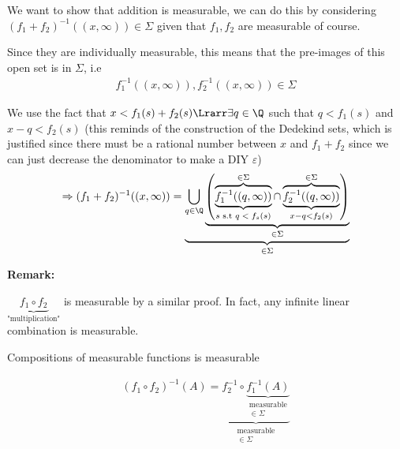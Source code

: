 \par\bigskip
\begin{prf}[]{}
  We want to show that addition is measurable, we can do this by considering $(f_1+f_2)^{-1}((x,\infty))\in\Sigma$ given that $f_1,f_2$ are measurable of course.
  \par\bigskip
  \noindent Since they are individually measurable, this means that the pre-images of this open set is in $\Sigma$, i.e
  \begin{equation*}
    \begin{gathered}
      f_1^{-1}((x,\infty)),f_2^{-1}((x,\infty))\in\Sigma
    \end{gathered}
  \end{equation*}\par
\noindent We use the fact that $x<f_1(s)+f_2(s)\Lrarr \exists q\in\Q$ such that $q<f_1(s)$ and $x-q<f_2(s)$ (this reminds of the construction of the Dedekind sets, which is justified since there must be a rational number between $x$ and $f_1+f_2$ since we can just decrease the denominator to make a DIY $\varepsilon$)
\begin{equation*}
  \begin{gathered}
    \Rightarrow (f_1+f_2)^{-1}((x,\infty)) = \underbrace{\bigcup_{q\in\Q}\underbrace{\left(\overbrace{\underbrace{f_1^{-1}((q,\infty))}_{\text{$s$ s.t $q<f_s(s)$}}}^{\in\Sigma}\cap \overbrace{\underbrace{f_2^{-1}((q,\infty))}_{x-q<f_2(s)}}^{\in\Sigma}\right)}_{\in\Sigma}}_{\in\Sigma}
  \end{gathered}
\end{equation*}
\end{prf}
\par\bigskip
\noindent\textbf{Remark:}\par
\noindent $\underbrace{f_1\circ f_2}_{\text{"multiplication"}}$ is measurable by a similar proof. In fact, any infinite linear combination is measurable.
\par\bigskip
\begin{lem}[]{}
  Compositions of measurable functions is measurable
\end{lem}
\par\bigskip
\begin{prf}[]{}
  \begin{equation*}
    \begin{gathered}
      (f_1\circ f_2)^{-1}(A) = \underbrace{f_2^{-1}\circ\underbrace{f_1^{-1}(A)}_{\substack{\text{measurable}\\ \in\Sigma}}}_{\substack{\text{measurable}\\\in\Sigma}} 
    \end{gathered}
  \end{equation*}
\end{prf}
